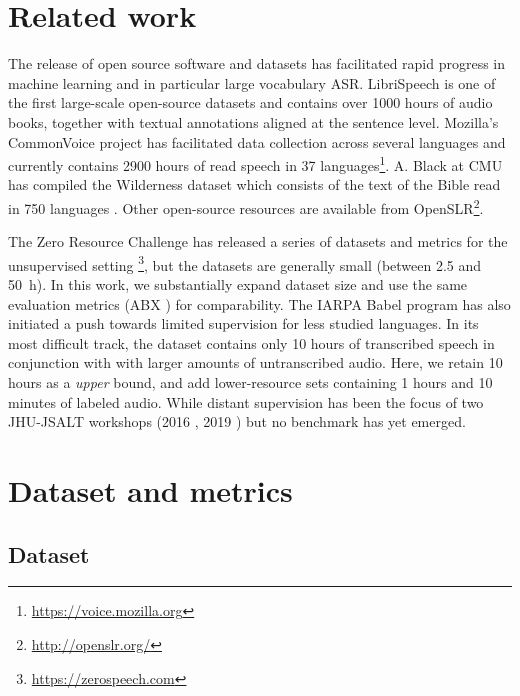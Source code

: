 \documentclass{article}
\begin{document}
\vspace{-3mm}
\section{Related work}\label{sec:related}
\vspace{-3mm}
The release of open source software and datasets has facilitated rapid progress in machine learning and in particular large vocabulary ASR. LibriSpeech is one of the first large-scale open-source datasets and contains over 1000 hours of audio books, together with textual annotations aligned at the sentence level. Mozilla's CommonVoice project has facilitated data collection across several languages and currently contains 2900 hours of read speech in 37 languages\footnote{\url{https://voice.mozilla.org}}. A. Black at CMU has compiled the Wilderness dataset which consists of the text of the Bible read in 750 languages \cite{black2019cmu}. Other open-source resources are available from OpenSLR\footnote{\url{http://openslr.org/}}.

The Zero Resource Challenge has released a series of datasets and metrics for the unsupervised setting \cite{Versteegh2016,dunbar2017}\footnote{\url{https://zerospeech.com}}, but the datasets are generally small (between 2.5 and 50~h). In this work, we substantially expand dataset size and use the same evaluation metrics (ABX \cite{Schatz2013ABX}) for comparability. The IARPA Babel program \cite{harper2014} has also initiated a push towards limited supervision for less studied languages. In its most difficult track, the dataset contains only 10 hours of transcribed speech in conjunction with  with larger amounts of untranscribed audio. Here, we retain 10 hours as a \textit{upper} bound, and add lower-resource sets containing 1 hours and 10 minutes of labeled audio. While distant supervision has been the focus of two JHU-JSALT workshops (2016 \cite{liu2017empirical}, 2019 \cite{chorowski2019}) but no benchmark has yet emerged. 

\vspace{-5pt}
\section{Dataset and metrics}
\label{sec:dataset}
\vspace{-5pt}
\subsection{Dataset}
\vspace{-10pt}
\end{document}
